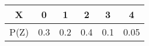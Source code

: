 \begin{center}
\begin{tabular}{|c|c|c|c|c|c|} 
    \hline
    X & 0 & 1 & 2 & 3 & 4 \\ 
    \hline
    P(Z) & 0.3 & 0.2 & 0.4 & 0.1 & 0.05 \\ 
    \hline
    \end{tabular}\end{center}